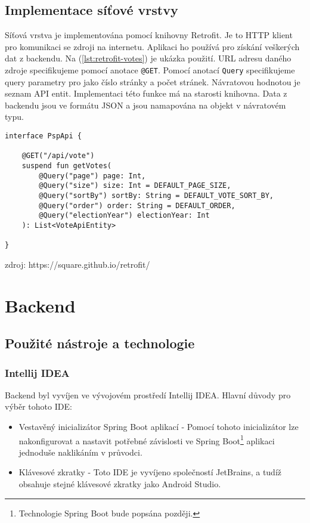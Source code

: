 \subsection{Implementace síťové vrstvy}
\label{sec:impl-network}

\noindent Síťová vrstva je implementována pomocí knihovny Retrofit. Je to HTTP klient pro komunikaci se zdroji na internetu. Aplikaci ho používá pro získání veškerých dat z backendu. Na (\ref{lst:retrofit-votes}) je ukázka použití. URL adresu daného zdroje specifikujeme pomocí anotace \lstinline|@GET|. Pomocí anotací \lstinline|Query| specifikujeme query parametry pro jako číslo stránky a počet stránek. Návratovou hodnotou je seznam API entit. Implementaci této funkce má na starosti knihovna. Data z backendu jsou ve formátu JSON a jsou namapována na objekt v návratovém typu.

\begin{lstlisting}[caption={Ukázka použití knihovny Retrofit pro získání seznamu hlasování z backendu}, label={lst:retrofit-votes}, tabsize=2]
interface PspApi {
	
	@GET("/api/vote")
	suspend fun getVotes(
		@Query("page") page: Int,
		@Query("size") size: Int = DEFAULT_PAGE_SIZE,
		@Query("sortBy") sortBy: String = DEFAULT_VOTE_SORT_BY,
		@Query("order") order: String = DEFAULT_ORDER,
		@Query("electionYear") electionYear: Int
	): List<VoteApiEntity>
	
}
\end{lstlisting}

zdroj: https://square.github.io/retrofit/

\section{Backend}

\subsection {Použité nástroje a technologie}
\subsubsection*{Intellij IDEA}
Backend byl vyvíjen ve vývojovém prostředí Intellij IDEA. Hlavní důvody pro výběr tohoto IDE:

\begin{itemize}
	\item Vestavěný inicializátor Spring Boot aplikací - Pomocí tohoto inicializátor lze nakonfigurovat a nastavit potřebné závislosti ve Spring Boot\footnote{Technologie Spring Boot bude popsána později.} aplikaci jednoduše naklikáním v průvodci.
	
	\item Klávesové zkratky - Toto IDE je vyvíjeno společností JetBrains, a tudíž obsahuje stejné klávesové zkratky jako Android Studio.
\end{itemize}

